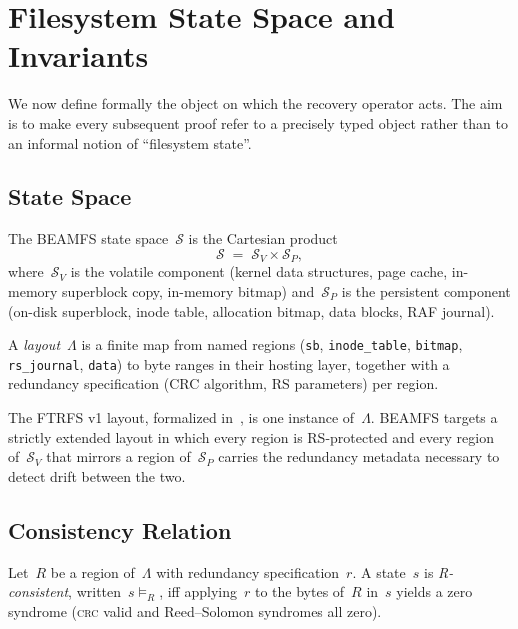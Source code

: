 \section{Filesystem State Space and Invariants}\label{sec:state}

We now define formally the object on which the recovery operator acts.
The aim is to make every subsequent proof refer to a precisely typed
object rather than to an informal notion of ``filesystem state''.

\subsection{State Space}

\begin{definition}\label{def:state}
The BEAMFS state space~\(\mathcal{S}\) is the Cartesian product
\[
  \mathcal{S} \;=\; \mathcal{S}_V \times \mathcal{S}_P,
\]
where~\(\mathcal{S}_V\) is the volatile component (kernel data
structures, page cache, in-memory superblock copy, in-memory bitmap)
and~\(\mathcal{S}_P\) is the persistent component (on-disk
superblock, inode table, allocation bitmap, data blocks, RAF journal).
\end{definition}

\begin{definition}[Layout]\label{def:layout}
A \emph{layout}~\(\Lambda\) is a finite map from named regions
(\texttt{sb}, \texttt{inode\_table}, \texttt{bitmap},
\texttt{rs\_journal}, \texttt{data}) to byte ranges in their
hosting layer, together with a redundancy specification (CRC
algorithm, RS parameters) per region.
\end{definition}

The FTRFS v1 layout, formalized in~\cite{desbrieres2026ftrfs}, is one
instance of~\(\Lambda\). BEAMFS targets a strictly extended layout in
which every region is RS-protected and every region of~\(\mathcal{S}_V\)
that mirrors a region of~\(\mathcal{S}_P\) carries the redundancy
metadata necessary to detect drift between the two.

\subsection{Consistency Relation}

\begin{definition}
Let~\(R\) be a region of~\(\Lambda\) with redundancy specification~\(r\).
A state~\(s\) is \emph{R-consistent}, written~\(s \models_R\), iff
applying~\(r\) to the bytes of~\(R\) in~\(s\) yields a zero syndrome
(\textsc{crc} valid and Reed--Solomon syndromes all zero).
\end{definition}

